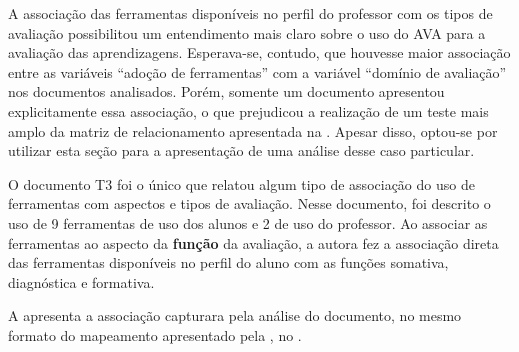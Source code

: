A associação das ferramentas disponíveis no perfil do professor com os tipos de avaliação possibilitou um entendimento mais claro sobre o uso do AVA para a avaliação das aprendizagens. Esperava-se, contudo, que houvesse maior associação entre as variáveis ``adoção de ferramentas'' com a variável ``domínio de avaliação'' nos documentos analisados. Porém, somente um documento apresentou explicitamente essa associação, o que prejudicou a realização de um teste mais amplo da matriz de relacionamento apresentada na . Apesar disso, optou-se por utilizar esta seção para a apresentação de uma análise desse caso particular.

O documento T3 foi o único que relatou algum tipo de associação do uso de ferramentas com aspectos e tipos de avaliação. Nesse documento, foi descrito o uso de 9 ferramentas de uso dos alunos e 2 de uso do professor. Ao associar as ferramentas ao aspecto da \textbf{função} da avaliação, a autora fez a associação direta das ferramentas disponíveis no perfil do aluno com as funções somativa, diagnóstica e formativa.

A  apresenta a associação capturara pela análise do documento, no mesmo formato do mapeamento apresentado pela , no .

